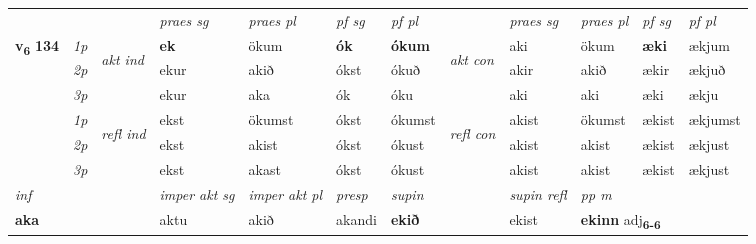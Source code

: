 \begin{longtable}[l]{X>{\footnotesize\itshape}llXXXXlXXXX}
 & &   & \textit{praes sg}  & \textit{praes pl}    & \textit{ pf sg} & \textit{pf pl} & & \textit{praes sg}  & \textit{praes pl}    & \textit{pf sg} & \textit{pf pl }  \\ \cmidrule{4-7} \cmidrule{9-12}
 \multirow{2}{*}{{{\textbf{v{\textsubscript{6}}} \Large{\textbf{134}}}}}  & 1p & \multirow{3}{*}{\begin{turn}{90}\textit{akt ind}\end{turn}} & \textbf{ek} & ökum & \textbf{ók} & \textbf{ókum} & \multirow{3}{*}{\begin{turn}{90}\textit{akt con}\end{turn}} &aki & ökum & \textbf{æki} & ækjum\\*
 & 2p &  &  ekur  & akið & ókst & ókuð & & akir & akið & ækir & ækjuð \\*
 & 3p &  & ekur & aka & ók & óku & & aki & aki& æki & ækju \\*
\cmidrule{4-7} \cmidrule{9-12}
 & 1p & \multirow{3}{*}{\begin{turn}{90}\textit{refl ind}\end{turn}}  & ekst & ökumst & ókst & ókumst & \multirow{3}{*}{\begin{turn}{90}\textit{refl con}\end{turn}}  &akist & ökumst & ækist & ækjumst \\*
 & 2p &  & ekst & akist & ókst & ókust & &akist & akist & ækist & ækjust \\*
 & 3p  & & ekst & akast & ókst & ókust & & akist & akist& ækist & ækjust \\*
\cmidrule{4-7} \cmidrule{9-12}

   {\textit{inf}} & &  & \textit{imper akt sg} & \textit{imper akt pl}   & \textit{presp} & \textit{supin} && \textit{supin refl} & \textit{pp m} \\*
  {\textbf{aka}} & && aktu  & akið   & akandi &  \textbf{ekið} && ekist & \multicolumn{2}{l}{\textbf{ekinn} adj\textbf{\textsubscript{6-6}}} \\*

\midrule


\end{longtable}
